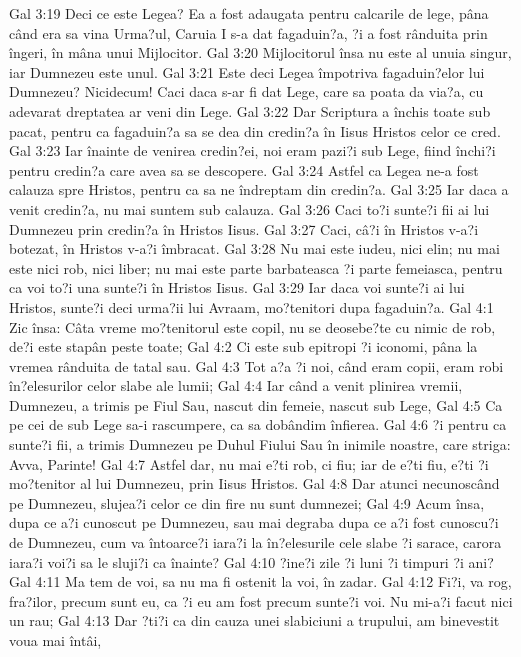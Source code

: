 Gal 3:19  Deci ce este Legea? Ea a fost adaugata pentru calcarile de lege, pâna când era sa vina Urma?ul, Caruia I s-a dat fagaduin?a, ?i a fost rânduita prin îngeri, în mâna unui Mijlocitor.
Gal 3:20  Mijlocitorul însa nu este al unuia singur, iar Dumnezeu este unul.
Gal 3:21  Este deci Legea împotriva fagaduin?elor lui Dumnezeu? Nicidecum! Caci daca s-ar fi dat Lege, care sa poata da via?a, cu adevarat dreptatea ar veni din Lege.
Gal 3:22  Dar Scriptura a închis toate sub pacat, pentru ca fagaduin?a sa se dea din credin?a în Iisus Hristos celor ce cred.
Gal 3:23  Iar înainte de venirea credin?ei, noi eram pazi?i sub Lege, fiind închi?i pentru credin?a care avea sa se descopere.
Gal 3:24  Astfel ca Legea ne-a fost calauza spre Hristos, pentru ca sa ne îndreptam din credin?a.
Gal 3:25  Iar daca a venit credin?a, nu mai suntem sub calauza.
Gal 3:26  Caci to?i sunte?i fii ai lui Dumnezeu prin credin?a în Hristos Iisus.
Gal 3:27  Caci, câ?i în Hristos v-a?i botezat, în Hristos v-a?i îmbracat.
Gal 3:28  Nu mai este iudeu, nici elin; nu mai este nici rob, nici liber; nu mai este parte barbateasca ?i parte femeiasca, pentru ca voi to?i una sunte?i în Hristos Iisus.
Gal 3:29  Iar daca voi sunte?i ai lui Hristos, sunte?i deci urma?ii lui Avraam, mo?tenitori dupa fagaduin?a.
Gal 4:1  Zic însa: Câta vreme mo?tenitorul este copil, nu se deosebe?te cu nimic de rob, de?i este stapân peste toate;
Gal 4:2  Ci este sub epitropi ?i iconomi, pâna la vremea rânduita de tatal sau.
Gal 4:3  Tot a?a ?i noi, când eram copii, eram robi în?elesurilor celor slabe ale lumii;
Gal 4:4  Iar când a venit plinirea vremii, Dumnezeu, a trimis pe Fiul Sau, nascut din femeie, nascut sub Lege,
Gal 4:5  Ca pe cei de sub Lege sa-i rascumpere, ca sa dobândim înfierea.
Gal 4:6  ?i pentru ca sunte?i fii, a trimis Dumnezeu pe Duhul Fiului Sau în inimile noastre, care striga: Avva, Parinte!
Gal 4:7  Astfel dar, nu mai e?ti rob, ci fiu; iar de e?ti fiu, e?ti ?i mo?tenitor al lui Dumnezeu, prin Iisus Hristos.
Gal 4:8  Dar atunci necunoscând pe Dumnezeu, slujea?i celor ce din fire nu sunt dumnezei;
Gal 4:9  Acum însa, dupa ce a?i cunoscut pe Dumnezeu, sau mai degraba dupa ce a?i fost cunoscu?i de Dumnezeu, cum va întoarce?i iara?i la în?elesurile cele slabe ?i sarace, carora iara?i voi?i sa le sluji?i ca înainte?
Gal 4:10  ?ine?i zile ?i luni ?i timpuri ?i ani?
Gal 4:11  Ma tem de voi, sa nu ma fi ostenit la voi, în zadar.
Gal 4:12  Fi?i, va rog, fra?ilor, precum sunt eu, ca ?i eu am fost precum sunte?i voi. Nu mi-a?i facut nici un rau;
Gal 4:13  Dar ?ti?i ca din cauza unei slabiciuni a trupului, am binevestit voua mai întâi,
